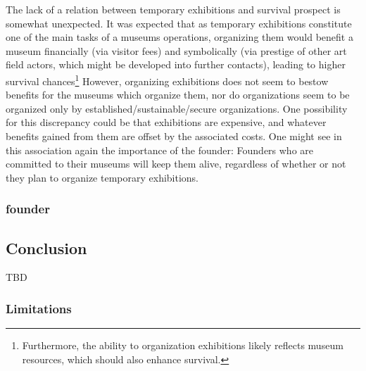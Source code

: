 \documentclass[12pt]{article}
\begin{document}
The lack of a relation between temporary exhibitions and survival prospect is somewhat unexpected.
It was expected that as temporary exhibitions constitute one of the main tasks of a museums operations, organizing them would benefit a museum financially (via visitor fees) and symbolically (via prestige of other art field actors, which might be developed into further contacts), leading to higher survival chances\footnote{Furthermore, the ability to organization exhibitions likely reflects museum resources, which should also enhance survival.}
However, organizing exhibitions does not seem to bestow benefits for the museums which organize them, nor do organizations seem to be organized only by established/sustainable/secure organizations.
One possibility for this discrepancy could be that exhibitions are expensive, and whatever benefits gained from them are offset by the associated costs.
One might see in this association again the importance of the founder:
Founders who are committed to their museums will keep them alive, regardless of whether or not they plan to organize temporary exhibitions.







\subsubsection*{founder}




\subsection*{Conclusion}

TBD




\begin{sloppypar}
\printbibliography
\end{sloppypar}



\subsubsection*{Limitations}
\end{document}
